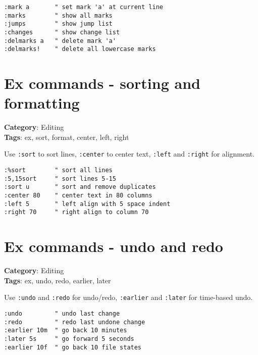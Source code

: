 {{{{{\begin{Exa*}{}
\begin{Verbatim}[fontsize=\footnotesize, breaklines, breakanywhere]
:mark a       " set mark 'a' at current line
:marks        " show all marks
:jumps        " show jump list
:changes      " show change list
:delmarks a   " delete mark 'a'
:delmarks!    " delete all lowercase marks
\end{Verbatim}
\end{Exa*}

\section{Ex commands - sorting and formatting}

\textbf{Category}: Editing\\ \textbf{Tags}: ex, sort, format, center, left, right
\vspace{0.5cm}

Use {\footnotesize \Verb§:sort§} to sort lines, {\footnotesize \Verb§:center§} to center text, {\footnotesize \Verb§:left§} and {\footnotesize \Verb§:right§} for alignment.

\begin{Exa*}{}
\begin{Verbatim}[fontsize=\footnotesize, breaklines, breakanywhere]
:%sort        " sort all lines
:5,15sort     " sort lines 5-15
:sort u       " sort and remove duplicates
:center 80    " center text in 80 columns
:left 5       " left align with 5 space indent
:right 70     " right align to column 70
\end{Verbatim}
\end{Exa*}

\section{Ex commands - undo and redo}

\textbf{Category}: Editing\\ \textbf{Tags}: ex, undo, redo, earlier, later
\vspace{0.5cm}

Use {\footnotesize \Verb§:undo§} and {\footnotesize \Verb§:redo§} for undo/redo, {\footnotesize \Verb§:earlier§} and {\footnotesize \Verb§:later§} for time-based undo.

\begin{Exa*}{}
\begin{Verbatim}[fontsize=\footnotesize, breaklines, breakanywhere]
:undo         " undo last change
:redo         " redo last undone change
:earlier 10m  " go back 10 minutes
:later 5s     " go forward 5 seconds
:earlier 10f  " go back 10 file states
\end{Verbatim}
\end{Exa*}

}}}}}
